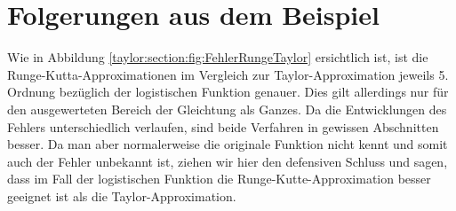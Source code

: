 %
%
%
\section{Folgerungen aus dem Beispiel
\label{taylor:section:folgerungen}}
Wie in Abbildung \ref{taylor:section:fig:FehlerRungeTaylor} ersichtlich ist, ist die Runge-Kutta-Approximationen im Vergleich zur Taylor-Approximation jeweils 5. Ordnung bezüglich der logistischen Funktion genauer.
Dies gilt allerdings nur für den ausgewerteten Bereich der Gleichtung als Ganzes.
Da die Entwicklungen des Fehlers unterschiedlich verlaufen, sind beide Verfahren in gewissen Abschnitten besser.
Da man aber normalerweise die originale Funktion nicht kennt und somit auch der Fehler unbekannt ist, ziehen wir hier den defensiven Schluss und sagen, dass im Fall der logistischen Funktion die Runge-Kutte-Approximation besser geeignet ist als die Taylor-Approximation.

